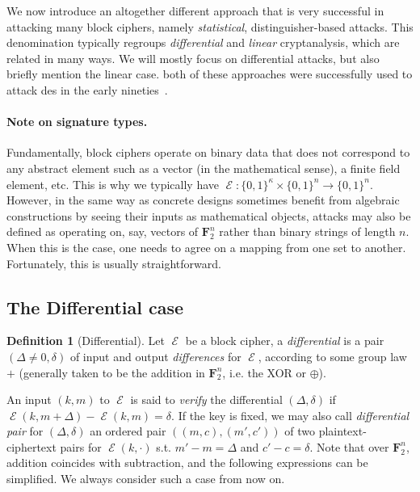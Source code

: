 \documentclass[11pt,a4paper]{article}
\theoremstyle{definition}
\newtheorem{defi}{Definition}
\theoremstyle{theorem}
\DeclareMathOperator\E{\mathcal{E}}
\newcommand\msb{\{0,1\}^n}
\newcommand\ksb{\{0,1\}^\kappa}
\begin{document}
We now introduce an altogether different approach that is very successful in attacking many block ciphers, namely \emph{statistical}, distinguisher-based attacks.
This denomination typically regroups \emph{differential} and \emph{linear} cryptanalysis, which are related in many ways. We will mostly focus on differential
attacks, but also briefly mention the linear case. both of these approaches were successfully used to attack des in the early
nineties~\cite{DBLP:conf/crypto/BihamS90,DBLP:conf/eurocrypt/Matsui93}.

\paragraph{Note on signature types.}
Fundamentally, block ciphers operate on binary data that does not correspond to any abstract element such as a vector (in the mathematical sense),
a finite field element, etc. This is why we typically have $\E : \ksb \times \msb \rightarrow \msb$. However, in the same way as concrete
designs sometimes benefit from algebraic constructions by seeing their inputs as mathematical objects, attacks may also be defined as operating
on, say, vectors of $\mathbf{F}_2^n$ rather than binary strings of length $n$. When this is the case, one needs to agree on a mapping from
one set to another. Fortunately, this is usually straightforward.

\subsection{The Differential case}

\begin{defi}[Differential]
Let $\E$ be a block cipher, a \emph{differential} is a pair $(\Delta \neq 0,\delta)$ of input and output \emph{differences} for $\E$, according to some
group law $+$ (generally taken to be the addition in $\mathbf{F}_2^n$, i.e. the XOR or $\oplus$).
\end{defi}
An input $(k,m)$ to $\E$ is said to \emph{verify} the differential
$(\Delta,\delta)$ if $\E(k,m + \Delta) - \E(k,m) = \delta$. If the key is fixed, we may also call \emph{differential pair}
for $(\Delta,\delta)$ an ordered pair $((m,c),(m',c'))$  of two plaintext-ciphertext pairs for $\E(k,\cdot)$ s.t. $m'-m = \Delta$ and $c'-c=\delta$.
Note that over $\mathbf{F}_2^n$, addition coincides with subtraction, and the following expressions can be simplified. We always consider such a case
from now on.
\end{document}
